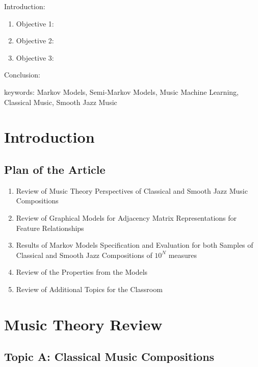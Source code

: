 
\twocolumn
\scriptsize
\begin{frontmatter}
		\title{}
		\author{}
		\address{The Mathematical Learning Space}
\end{frontmatter}	

Introduction:
\begin{enumerate}
\item Objective 1:
\item Objective 2:
\item Objective 3:
\end{enumerate}
Conclusion:

keywords: Markov Models, Semi-Markov Models, Music Machine Learning, Classical Music, Smooth Jazz Music

\section{Introduction}

\subsection{Plan of the Article}

\begin{enumerate}
\item Review of Music Theory Perspectives of Classical and Smooth Jazz Music Compositions
\item Review of Graphical Models for Adjacency Matrix Representations for Feature Relationships
\item Results of Markov Models Specification and Evaluation for both Samples of Classical and Smooth Jazz Compositions of $10^N$ measures
\item Review of the Properties from the Models
\item Review of Additional Topics for the Classroom
\end{enumerate}

\section{Music Theory Review}

\subsection{Topic A: Classical Music Compositions}

